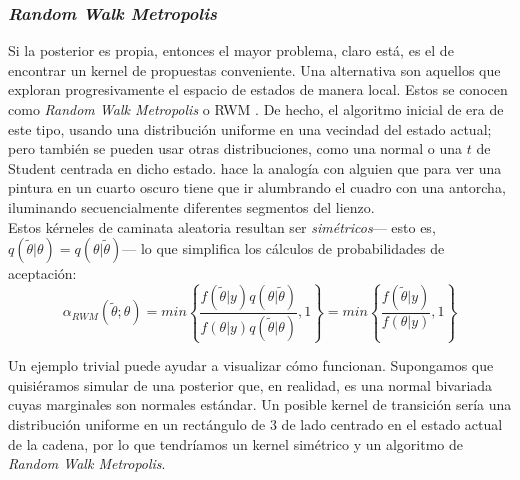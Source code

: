 \subsubsection*{\textit{Random Walk Metropolis}}

Si la posterior es propia, entonces el mayor problema, claro está, es el de encontrar un kernel de propuestas conveniente. Una alternativa son aquellos que exploran progresivamente el espacio de estados de manera local. Estos se conocen como \textit{Random Walk Metropolis} o RWM \parencite{RobertCasella10}. De hecho, el algoritmo inicial de \textcite{Metropolis53} era de este tipo, usando una distribución uniforme en una vecindad del estado actual; pero también se pueden usar otras distribuciones, como una normal o una $t$ de Student centrada en dicho estado. \textcite{Robert15} hace la analogía con alguien que para ver una pintura en un cuarto oscuro tiene que ir alumbrando el cuadro con una antorcha, iluminando secuencialmente diferentes segmentos del lienzo.\\

Estos kérneles de caminata aleatoria resultan ser \textit{simétricos}--- esto es,  $q(\tilde{\theta}|\theta) = q(\theta |\tilde{\theta})$--- lo que simplifica los cálculos de probabilidades de aceptación:
\begin{equation*}
\alpha_{RWM}(\tilde{\theta};\theta)=min\left\lbrace\dfrac{f(\tilde{\theta}|y)q(\theta|\tilde{\theta})}{f(\theta|y)q(\tilde{\theta}|\theta)},1\right\rbrace = min\left\lbrace\dfrac{f(\tilde{\theta}|y)}{f(\theta|y)},1\right\rbrace
\end{equation*}

Un ejemplo trivial puede ayudar a visualizar cómo funcionan. Supongamos que quisiéramos simular de una posterior que, en realidad, es una normal bivariada cuyas marginales son normales estándar. Un posible kernel de transición sería una distribución uniforme en un rectángulo de $3$ de lado centrado en el estado actual de la cadena, por lo que tendríamos un kernel simétrico y un algoritmo de \textit{Random Walk Metropolis}.\\ 

